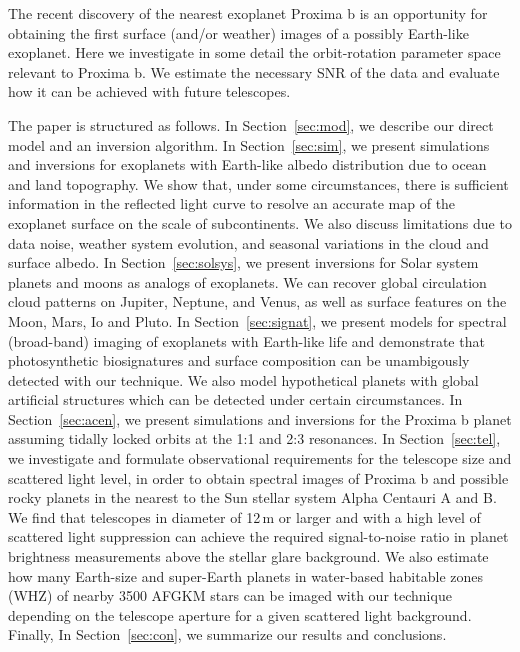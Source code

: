 \documentclass{emulateapj}
\begin{document}
The recent discovery of the nearest exoplanet Proxima b \citep{proxb} is an opportunity
for obtaining the first surface (and/or weather) images of a possibly Earth-like exoplanet.  
Here we  investigate in some detail the orbit-rotation parameter space relevant to Proxima b.
We estimate the necessary SNR of the data and evaluate how it can be achieved
with future telescopes.

The paper is structured as follows.
In Section~\ref{sec:mod}, we describe our direct model and an inversion algorithm.
In Section~\ref{sec:sim}, we present simulations and inversions for exoplanets with 
Earth-like albedo distribution due to ocean and land topography. 
We show that, under some circumstances, there is sufficient information 
in the reflected light curve to resolve an accurate map of the exoplanet surface
on the scale of subcontinents.
We also discuss limitations due to data noise, weather system evolution,
and seasonal variations in the cloud and surface albedo. 
In Section~\ref{sec:solsys}, we present inversions for Solar system 
planets and moons as analogs of exoplanets. We can recover global circulation 
cloud patterns on Jupiter, Neptune, and Venus, as well as surface features on 
the Moon, Mars, Io and Pluto.
In Section~\ref{sec:signat}, we present models for spectral (broad-band) imaging
of exoplanets with Earth-like life 
and demonstrate that photosynthetic biosignatures and surface composition
can be unambigously detected with our technique. We also model hypothetical planets
with global artificial structures which can be detected under certain circumstances.
In Section~\ref{sec:acen}, we present simulations and inversions for the Proxima b
planet assuming tidally locked orbits at the 1:1 and 2:3 resonances. 
In Section~\ref{sec:tel}, we investigate and formulate observational requirements
for the telescope size and scattered light level, in order to obtain spectral images
of Proxima b and possible rocky planets in the nearest to the Sun stellar system 
Alpha Centauri A and B. We find that telescopes in diameter of 12\,m or larger
and with a high level of scattered light suppression 
can achieve the required signal-to-noise ratio in planet brightness 
measurements above the stellar glare background. 
We also estimate how many Earth-size and super-Earth planets in water-based habitable zones
(WHZ) of nearby 3500 AFGKM stars can be imaged with our technique depending on the telescope 
aperture for a given scattered light background.
Finally, In Section~\ref{sec:con}, we summarize our results and conclusions.
\end{document}
